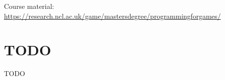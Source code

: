 \documentclass[a4paper]{article}
\begin{document}
\tableofcontents

\vfill
Course material:
\url{https://research.ncl.ac.uk/game/mastersdegree/programmingforgames/}

\section{TODO}

TODO
\end{document}
